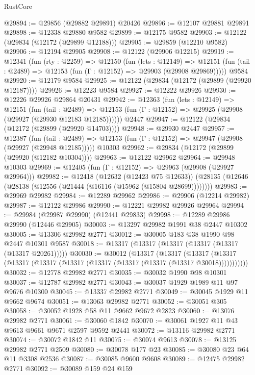 \begin{lexlean}{RustCore}
\begin{coremodule}
@29894 := @29856 (@29882 @29891) @20426
@29896 := @12107 @29881 @29891
@29898 := @12338 @29880 @9582
@29899 := @12175 @9582
@29903 := @12122 (@29834 (@12172 (@29899 @12188)))
@29905 := @29859 (@12210 @9582)
@29906 := @12194 @29905
@29908 := @12122 (@29906 @12215)
@29919 := @12341
    (fun (rty : @2259) =>
    @12150
      (fun (lets : @12149) =>
      @12151 (fun (tail : @2489) => @12153 (fun (Γ : @12152) => @29903 (@29908 @29869)))))
    @9584
@29920 := @12179 @9584
@29925 := @12122 (@29834 (@12172 (@29899 (@29920 @12187))))
@29926 := @12223 @9584
@29927 := @12222 @29926
@29930 := @12226 @29926 @29864 @20431
@29942 := @12363
    (fun (lets : @12149) =>
    @12151
      (fun (tail : @2489) =>
      @12153 (fun (Γ : @12152) => @29925 (@29908 (@29927 (@29930 @12183 @12185))))))
    @2447
@29947 := @12122 (@29834 (@12172 (@29899 (@29920 @14703))))
@29948 := @29930 @2447
@29957 := @12387
    (fun (tail : @2489) => @12153 (fun (Γ : @12152) => @29947 (@29908 (@29927 (@29948 @12185)))))
    @10303
@29962 := @29834 (@12172 (@29899 (@29920 (@12182 @10304))))
@29963 := @12122 @29962
@29964 := @29948 @10303
@29969 := @12405 (fun (Γ : @12152) => @29963 (@29908 (@29927 @29964)))
@29982 := @12418
    (@12632 (@12423 @75 @12633))
    (@28135 (@12646 (@28138 (@12556 (@21444 (@16116 (@15962 (@15804 @28699))))))))
@29983 := @29969 @29982
@29984 := @12289 @29962
@29986 := @29906 (@12214 @29982)
@29987 := @12122 @29986
@29990 := @12221 @29982 @29926 @29964
@29994 := @29984 (@29987 @29990) (@12441 @29833)
@29998 := @12289 @29986 @29990 (@12446 @29905)
@30003 := @13297 @29982 @1991 @38 @2447 @10302
@30005 := @13306 @29982 @2771
@30012 := @30005 @183 @38 @1990 @98 @2447 @10301 @9587
@30018 := @13317 (@13317 (@13317 (@13317 (@13317 (@13317 @20261)))))
@30030 := @30012
    (@13317
      (@13317
        (@13317 (@13317 (@13317 (@13317 (@13317 (@13317 (@13317 (@13317 (@13317 @30018)))))))))))
@30032 := @12778 @29982 @2771
@30035 := @30032 @1990 @98 @10301
@30037 := @12787 @29982 @2771
@30043 := @30037 @1929 @1989 @11 @97 @9676 @10300
@30045 := @13337 @29982 @2771
@30049 := @30045 @1929 @11 @9662 @9674
@30051 := @13063 @29982 @2771
@30052 := @30051 @305
@30058 := @30052 @1928 @58 @11 @9662 @9672 @2823
@30060 := @13076 @29982 @2771
@30061 := @30060 @1842
@30070 := @30061 @1927 @11 @43 @9613 @9661 @9671 @2597 @9592 @2441
@30072 := @13116 @29982 @2771
@30074 := @30072 @1842 @11
@30075 := @30074 @9613
@30078 := @13125 @29982 @2771 @2509
@30080 := @30078 @177 @23
@30085 := @30080 @23 @64 @11 @3308 @2536
@30087 := @30085 @9600 @9608
@30089 := @12475 @29982 @2771
@30092 := @30089 @159 @24 @159

\end{coremodule}
\end{lexlean}
